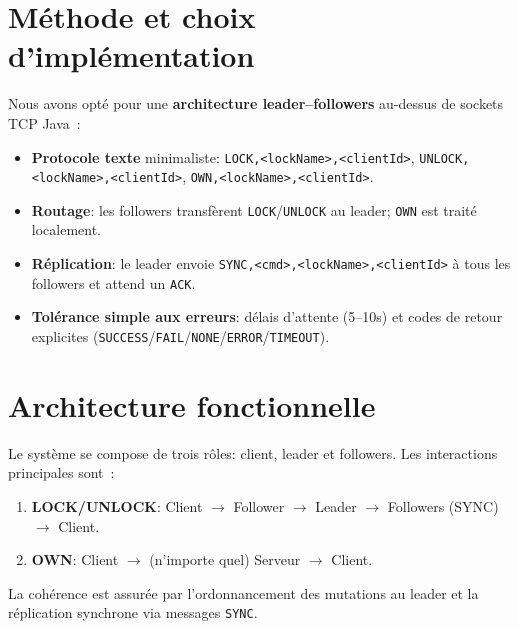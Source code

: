 \documentclass[a4paper,11pt]{article}
\begin{document}
\section{Méthode et choix d'implémentation}
Nous avons opté pour une \textbf{architecture leader–followers} au-dessus de sockets TCP Java :\\[-0.6em]
\begin{itemize}
\item \textbf{Protocole texte} minimaliste: \texttt{LOCK,<lockName>,<clientId>}, \texttt{UNLOCK,<lockName>,<clientId>}, \texttt{OWN,<lockName>,<clientId>}.\\
\item \textbf{Routage}: les followers transfèrent \texttt{LOCK}/\texttt{UNLOCK} au leader; \texttt{OWN} est traité localement.\\
\item \textbf{Réplication}: le leader envoie \texttt{SYNC,<cmd>,<lockName>,<clientId>} à tous les followers et attend un \texttt{ACK}.\\
\item \textbf{Tolérance simple aux erreurs}: délais d'attente (5–10s) et codes de retour explicites (\texttt{SUCCESS}/\texttt{FAIL}/\texttt{NONE}/\texttt{ERROR}/\texttt{TIMEOUT}).
\end{itemize}

\section{Architecture fonctionnelle}
Le système se compose de trois rôles: client, leader et followers. Les interactions principales sont :
\begin{enumerate}
\item \textbf{LOCK/UNLOCK}: Client $\rightarrow$ Follower $\rightarrow$ Leader $\rightarrow$ Followers (SYNC) $\rightarrow$ Client.
\item \textbf{OWN}: Client $\rightarrow$ (n'importe quel) Serveur $\rightarrow$ Client.
\end{enumerate}
La cohérence est assurée par l'ordonnancement des mutations au leader et la réplication synchrone via messages \texttt{SYNC}.
\end{document}
